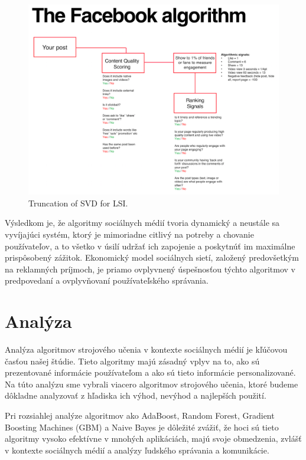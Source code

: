 \documentclass[12pt,twoside,slovak,a4paper]{article}
\begin{document}
\begin{figure}[h]
    \centering
    \includegraphics[scale=0.6]{FacebookAlgorithmExample.PNG} 
    \caption{Truncation of SVD for LSI. \cite{7087040}} %
    \label{fig:truncation}
\end{figure}


Výsledkom je, že algoritmy sociálnych médií tvoria dynamický a neustále sa vyvíjajúci systém, ktorý je mimoriadne citlivý na potreby a chovanie používateľov, a to všetko v úsilí udržať ich zapojenie a poskytnúť im maximálne prispôsobený zážitok. Ekonomický model sociálnych sietí, založený predovšetkým na reklamných príjmoch, je priamo ovplyvnený úspešnosťou týchto algoritmov v predpovedaní a ovplyvňovaní používateľského správania.








\section{Analýza}
Analýza algoritmov strojového učenia v kontexte sociálnych médií je kľúčovou časťou našej štúdie. Tieto algoritmy majú zásadný vplyv na to, ako sú prezentované informácie používateľom a ako sú tieto informácie personalizované. Na túto analýzu sme vybrali viacero algoritmov strojového učenia, ktoré budeme dôkladne analyzovať z hľadiska ich výhod, nevýhod a najlepších použití.

Pri rozsiahlej analýze algoritmov ako AdaBoost, Random Forest, Gradient Boosting Machines (GBM) a Naive Bayes je dôležité zvážiť, že hoci sú tieto algoritmy vysoko efektívne v mnohých aplikáciách, majú svoje obmedzenia, zvlášť v kontexte sociálnych médií a analýzy ľudského správania a komunikácie.
\end{document}
